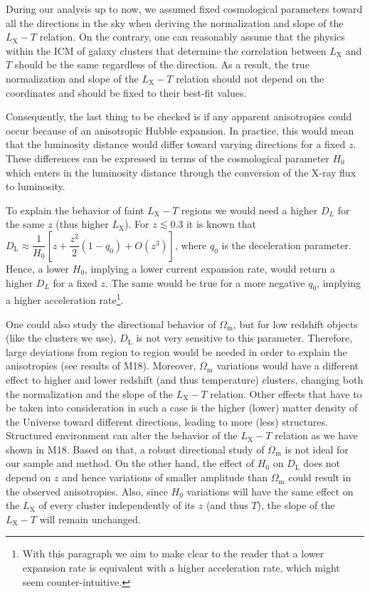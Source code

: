 \documentclass{aa}   %
\begin{document}
During our analysis up to now, we assumed fixed cosmological parameters toward all the directions in the sky when deriving the normalization and slope of the $L_{\text{X}}-T$ relation. On the contrary, one can reasonably assume that the physics within the ICM of galaxy clusters that determine the correlation between $L_{\text{X}}$ and $T$ should be the same regardless of the direction. As a result, the true normalization and slope of the $L_{\text{X}}-T$ relation should not depend on the coordinates and should be fixed to their best-fit values. 

Consequently, the last thing to be checked is if any apparent anisotropies could occur because of an anisotropic Hubble expansion. In practice, this would mean that the luminosity distance would differ toward varying directions for a fixed $z$. These differences can be expressed in terms of the cosmological parameter $H_0$ which enters in the luminosity distance through the conversion of the X-ray flux to luminosity. 

To explain the behavior of faint $L_{\text{X}}-T$ regions we would need a higher $D_L$ for the same $z$ (thus higher $L_{\text{X}}$). For $z\lesssim 0.3$ it is known that $D_{\text{L}}\approx \dfrac{1}{H_0}[z+\dfrac{z^2}{2}(1-q_0)+O(z^3)]$, where $q_0$ is the deceleration parameter. Hence, a lower $H_0$, implying a lower current expansion rate, would return a higher $D_L$ for a fixed $z$. The same would be true for a more negative $q_0$, implying a higher acceleration rate\footnote{With this paragraph we aim to make clear to the reader that a lower expansion rate is equivalent with a higher acceleration rate, which might seem counter-intuitive.}.

One could also study the directional behavior of $\Omega_{\text{m}}$, but for low redshift objects (like the clusters we use), $D_{\text{L}}$ is not very sensitive to this parameter. Therefore, large deviations from region to region would be needed in order to explain the anisotropies (see results of M18). Moreover, $\Omega_{\text{m}}$ variations would have a different effect to higher and lower redshift (and thus temperature) clusters, changing both the normalization and the slope of the $L_{\text{X}}-T$ relation. Other effects that have to be taken into consideration in such a case is the higher (lower) matter density of the Universe toward different directions, leading to more (less) structures. Structured environment can alter the behavior of the $L_{\text{X}}-T$ relation as we have shown in M18. Based on that, a robust directional study of  $\Omega_{\text{m}}$ is not ideal for our sample and method.
On the other hand, the effect of $H_0$ on $D_{\text{L}}$ does not depend on $z$ and hence variations of smaller amplitude than $\Omega_{\text{m}}$ could result in the observed anisotropies. Also, since $H_0$ variations will have the same effect on the $L_{\text{X}}$ of every cluster independently of its $z$ (and thus $T$), the slope of the $L_{\text{X}}-T$ will remain unchanged.
\end{document}
